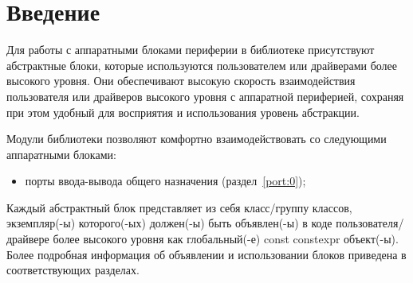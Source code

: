 \section{Введение}
Для работы с аппаратными блоками периферии в библиотеке присутствуют абстрактные блоки, которые используются пользователем или драйверами более высокого уровня. Они обеспечивают высокую скорость взаимодействия пользователя или драйверов высокого уровня с аппаратной периферией, сохраняя при этом удобный для восприятия и использования уровень абстракции.

Модули библиотеки позволяют комфортно взаимодействовать со следующими аппаратными блоками:
\begin{itemize}
	\item порты ввода-вывода общего назначения (раздел~\ref{port:0});
\end{itemize}

Каждый абстрактный блок представляет из себя класс/группу классов, экземпляр(-ы) которого(-ых) должен(-ы) быть объявлен(-ы) в коде пользователя/драйвере более высокого уровня как гло\-баль\-ный(-е) const constexpr объект(-ы). Более подробная информация об объявлении и использовании блоков приведена в соответствующих разделах.
